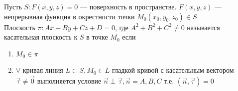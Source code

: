 		
		\begin{Def}
			Пусть $S : F(x, y, z) = 0$ --- поверхность в пространстве. $F(x, y, z)$ --- непрерывная функция в окрестности точки $M_0(x_0, y_0, z_0) \in S$\\
			Плоскость $\pi : Ax + By + Cz + D = 0$, где $A^2 + B^2 + C^2 \neq 0$ называется касательная плоскость к $S$ в точке $M_0$ если
			\begin{enumerate}
				\item $M_0 \in \pi$ 
				\item $\forall $ кривая линия $L \subset S, M_0 \in L$ гладкой кривой с касательным вектором $\vec{\tau} \neq \vec{0}$ выполняется условие $\vec{n} \perp \vec{\tau}, \vec{n} = {A, B, C}$ т.е. $(\vec{n}, \vec{\tau}) = 0$
			\end{enumerate}
			
         	\begin{figure}[bh]
            \noindent{}
            \end{figure}
						
		\end{Def}
	
